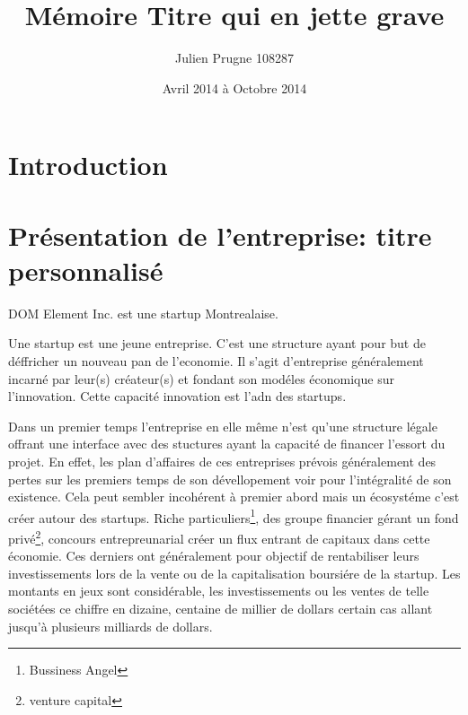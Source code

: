 \documentclass[11pt, a4paper ]{article}
\title{Mémoire Titre qui en jette grave}
\author{Julien Prugne 108287}
\date{Avril 2014 à Octobre 2014}
\let\stdsection\section
\renewcommand\section{\newpage\stdsection}
\begin{document}
	\maketitle
	\tableofcontents

	\breakpage
	\section{Introduction} %


	\breakpage
	\section{Présentation de l'entreprise: titre personnalisé} %

DOM Element Inc. est une startup Montrealaise.

Une startup\cite{theseStartup} est une jeune entreprise. C'est une structure ayant pour but de déffricher un nouveau pan de l'economie. Il s'agit d'entreprise généralement incarné par leur(s) créateur(s) et fondant son modéles économique sur l'innovation. Cette capacité innovation est l'adn des startups.

Dans un premier temps l'entreprise en elle même n'est qu'une structure légale offrant une interface avec des stuctures ayant la capacité de financer l'essort du projet. En effet, les plan d'affaires de ces entreprises prévois généralement des pertes sur les premiers temps de son dévellopement voir pour l'intégralité de son existence. Cela peut sembler incohérent à premier abord mais un écosystéme c'est créer autour des startups. Riche particuliers\footnote{Bussiness Angel}, des groupe financier gérant un fond privé\footnote{venture capital}, concours entrepreunarial créer un flux entrant de capitaux dans cette économie. Ces derniers ont généralement pour objectif de rentabiliser leurs investissements lors de la vente ou de la capitalisation boursiére de la startup. Les montants en jeux sont considérable, les investissements ou les ventes de telle sociétées ce chiffre en dizaine, centaine de millier de dollars certain cas allant jusqu'à plusieurs milliards de dollars.
\end{document}
